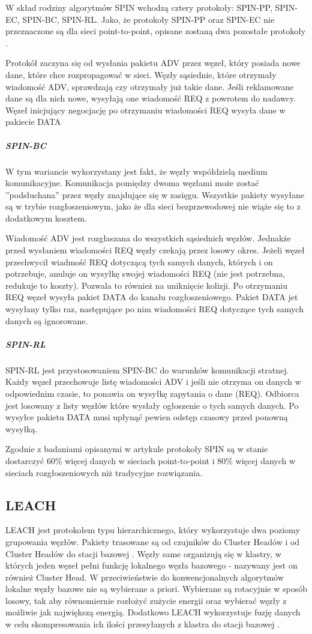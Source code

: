 W skład rodziny algorytmów SPIN wchodzą cztery protokoły: SPIN-PP, SPIN-EC, SPIN-BC, SPIN-RL. Jako, że protokoły SPIN-PP oraz SPIN-EC nie przeznaczone są dla sieci point-to-point, opisane zostaną dwa pozostałe protokoły \cite{Dargie2010, Kulik2002}.

Protokół zaczyna się od wysłania pakietu ADV przez węzeł, który posiada nowe dane, które chce rozpropagować w sieci. Węzły sąsiednie, które otrzymały wiadomość ADV, sprawdzają czy otrzymały już takie dane. Jeśli reklamowane dane są dla nich nowe, wysyłają one wiadomość REQ z powrotem do nadawcy. Węzeł inicjujący negocjację po otrzymaniu wiadomości REQ wysyła dane w pakiecie DATA

\subparagraph{SPIN-BC}
W tym wariancie wykorzystany jest fakt, że węzły współdzielą medium komunikacyjne. Komunikacja pomiędzy dwoma węzłami może zostać ''podsłuchana'' przez węzły znajdujące się w zasięgu. Wszystkie pakiety wysyłane są w trybie rozgłoszeniowym, jako że dla sieci bezprzewodowej nie wiąże się to z dodatkowym kosztem.

Wiadomość ADV jest rozgłaszana do wszystkich sąsiednich węzłów. Jednakże przed wysłaniem wiadomości REQ węzły czekają przez losowy okres. Jeżeli węzeł przechwycił wiadmość REQ dotyczącą tych samych danych, których i on potrzebuje, anuluje on wysyłkę swojej wiadomości REQ (nie jest potrzebna, redukuje to koszty). Pozwala to również na uniknięcie kolizji. Po otrzymaniu REQ węzeł wysyła pakiet DATA do kanału rozgłoszeniowego. Pakiet DATA jet wysyłany tylko raz, następujące po nim wiadomości REQ dotyczące tych samych danych są ignorowane.
\subparagraph{SPIN-RL}
SPIN-RL jest przystosowaniem SPIN-BC do warunków komunikacji stratnej. Każdy węzeł przechowuje listę wiadomości ADV i jeśli nie otrzyma on danych w odpowiednim czasie, to ponawia on wysyłkę zapytania o dane (REQ). Odbiorca jest losowany z listy węzłów które wysłały ogłoszenie o tych samych danych.
Po wysyłce pakietu DATA musi upłynąć pewien odstęp czasowy przed ponowną wysyłką.

Zgodnie z badaniami opisanymi w artykule \cite{Kulik2002} protokoły SPIN są w stanie dostarczyć 60\% więcej danych w sieciach point-to-point i 80\% więcej danych w sieciach rozgłoszeniowych niż tradycyjne rozwiązania.  
\subsection{LEACH} \label{subsec:leach}
LEACH jest protokołem typu hierarchicznego, który wykorzystuje dwa poziomy grupowania węzłów. Pakiety trasowane są od czujników do Cluster Headów i od Cluster Headów do stacji bazowej \cite{Yu2006}.
Węzły same organizują się w klastry, w których jeden węzeł pełni funkcję lokalnego węzła bazowego - nazywany jest on również Cluster Head. W przeciwieństwie do konwencjonalnych algorytmów lokalne węzły bazowe nie są wybierane a priori. Wybierane są rotacyjnie w sposób losowy, tak aby równomiernie rozłożyć zużycie energii oraz wybierać węzły z możliwie jak największą energią. Dodatkowo LEACH wykorzystuje fuzję danych w celu skompresowania ich ilości przesyłanych z klastra do stacji bazowej \cite{Akkaya2005, Heinzelman00}.

